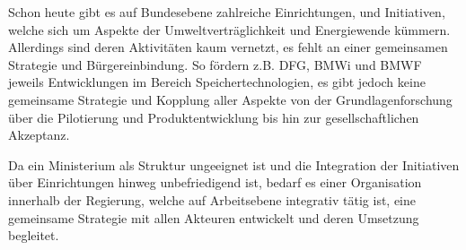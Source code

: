 Schon heute gibt es auf Bundesebene zahlreiche Einrichtungen, und Initiativen, welche sich um Aspekte der Umweltverträglichkeit und Energiewende kümmern.
Allerdings sind deren Aktivitäten kaum vernetzt, es fehlt an einer gemeinsamen Strategie und Bürgereinbindung.
So fördern z.B. DFG, BMWi und BMWF jeweils Entwicklungen im Bereich Speichertechnologien, es gibt jedoch keine gemeinsame Strategie und Kopplung aller Aspekte von der Grundlagenforschung über die Pilotierung und Produktentwicklung bis hin zur gesellschaftlichen Akzeptanz.

Da ein Ministerium als Struktur ungeeignet ist und die Integration der Initiativen über Einrichtungen hinweg unbefriedigend ist, bedarf es einer Organisation innerhalb der Regierung, welche auf Arbeitsebene integrativ tätig ist, eine gemeinsame Strategie mit allen Akteuren entwickelt und deren Umsetzung begleitet.
